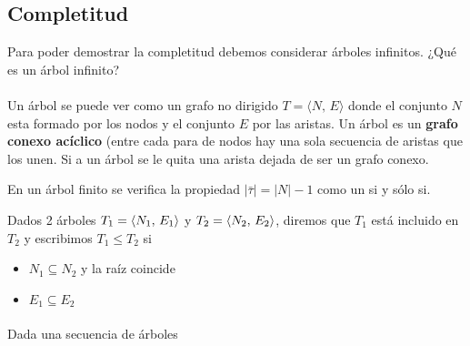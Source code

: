 \subsection{Completitud}
Para poder demostrar la completitud debemos considerar árboles infinitos. ¿Qué es un árbol infinito?
\paragraph{}
\begin{definition}
Un árbol se puede ver como un grafo no dirigido $T=\langle N, \, E \rangle$ donde el conjunto $N$ esta formado por los nodos y el conjunto $E$ por las aristas. Un árbol es un \textbf{grafo conexo  acíclico} (entre cada para de nodos hay una sola secuencia de aristas que los unen. Si a un árbol se le quita una arista dejada de ser un grafo conexo. 
\end{definition}
En un árbol finito se verifica la propiedad $\vert \bar{\tau} \vert = \vert N \vert -1 $ como un si y sólo si. 

\begin{definition}
Dados 2 árboles $T_{1}=\langle N_{1}, \, E_{1} \rangle$ y $T_{2}=\langle N_{2}, \, E_{2} \rangle$, diremos que $T_1$ está incluido en $T_2$ y escribimos $T_1 \leq T_2$ si 
\begin{itemize}
	\item $N_1 \subseteq N_2$ y la raíz coincide
	\item $E_1 \subseteq E_2$
\end{itemize}
\end{definition}
\paragraph{}
Dada una secuencia de árboles 